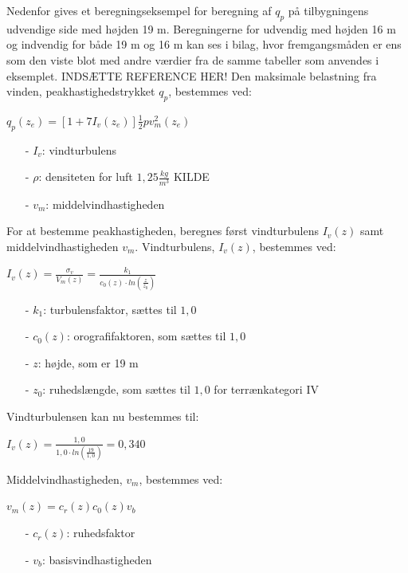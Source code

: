 Nedenfor gives et beregningseksempel for beregning af $q_p$ på tilbygningens udvendige side med højden 19 m. Beregningerne for udvendig med højden 16 m og indvendig for både 19 m og 16 m kan ses i bilag, hvor fremgangsmåden er ens som den viste blot med andre værdier fra de samme tabeller som anvendes i eksemplet. INDSÆTTE REFERENCE HER!
\newline
\newline
Den maksimale belastning fra vinden, peakhastighedstrykket $q_p$, bestemmes ved:
\begin{center}
$q_p(z_e)=[1+7I_v(z_e)]\frac{1}{2}pv_m^2(z_e)$
\end{center}
\begin{itemize}
	\item[-] $I_v$: vindturbulens
	\item[-] $\rho$: densiteten for luft $1,\!25 \frac{kg}{m^3}$ KILDE
	\item[-] $v_m$: middelvindhastigheden
\end{itemize}
For at bestemme peakhastigheden, beregnes først vindturbulens $I_v(z)$ samt middelvindhastigheden $v_m$.
\newline
\newline
Vindturbulens, $I_v(z)$, bestemmes ved:
\begin{center}
$I_v(z)=\frac{\sigma_v}{V_m(z)}=\frac{k_1}{c_0(z)\cdot ln(\frac{z}{z_0})}$
\end{center}
\begin{itemize}
	\item[-] $k_1$: turbulensfaktor, sættes til $1,\!0$ \citep[ kapitel 4.4]{EU91}
	\item[-] $c_0(z)$: orografifaktoren, som sættes til $1,\!0$ \citep[ kapitel 4.3.1]{EU91}
	\item[-] $z$: højde, som er 19 m
	\item[-] $z_0$: ruhedslængde, som sættes til $1,\!0$ for terrænkategori IV \citep[ tabel 4.1 kapitel 4.3.2]{EU91}
\end{itemize}
Vindturbulensen kan nu bestemmes til:
\begin{center}
$I_v(z)=\frac{1,\!0}{1,\!0\cdot ln(\frac{19}{1,\!0})}=0,\!340$
\end{center}
Middelvindhastigheden, $v_m$, bestemmes ved:
\begin{center}
$v_m(z)=c_r(z)c_0(z)v_b$
\end{center}
\begin{itemize}
	\item[-] $c_r(z)$: ruhedsfaktor
	\item[-] $v_b$: basisvindhastigheden
\end{itemize}
